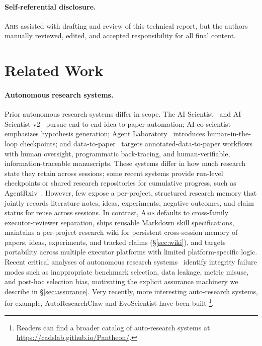 \documentclass{article}
\newcommand{\aris}{\textsc{Aris}}
\theoremstyle{remark}
\begin{document}
\paragraph{Self-referential disclosure.}
\aris{} assisted with drafting and review of this technical report, but the authors manually reviewed, edited, and accepted responsibility for all final content.

 \section{Related Work}
\label{sec:related}


\paragraph{Autonomous research systems.}
Prior autonomous research systems differ in scope.
The AI Scientist~\citep{lu2024aiscientist} and AI Scientist-v2~\citep{yamada2025aiscientistv2} pursue end-to-end idea-to-paper automation; AI co-scientist~\citep{gottweis2025coscientist} emphasizes hypothesis generation; Agent Laboratory~\citep{schmidgall2025agentrxiv} introduces human-in-the-loop checkpoints; and data-to-paper~\citep{ifargan2024data2paper} targets annotated-data-to-paper workflows with human oversight, programmatic back-tracing, and human-verifiable, information-traceable manuscripts.
These systems differ in how much research state they retain across sessions; some recent systems provide run-level checkpoints or shared research repositories for cumulative progress, such as AgentRxiv~\citep{schmidgall2025agentrxiv}. However, few expose a per-project, structured research memory that jointly records literature notes, ideas, experiments, negative outcomes, and claim status for reuse across sessions.
In contrast, \aris{} defaults to cross-family executor-reviewer separation, ships reusable Markdown skill specifications, maintains a per-project research wiki for persistent cross-session memory of papers, ideas, experiments, and tracked claims (\S\ref{sec:wiki}), and targets portability across multiple executor platforms with limited platform-specific logic.
Recent critical analyses of autonomous research systems~\citep{luo2025aiscientistpitfalls} identify integrity failure modes such as inappropriate benchmark selection, data leakage, metric misuse, and post-hoc selection bias, motivating the explicit assurance machinery we describe in \S\ref{sec:assurance}. Very recently, more interesting auto-research systems, for example, AutoResearchClaw \citep{liu2026autoresearchclaw} and EvoScientist \citep{evoscientist2026} have been built \footnote{Readers can find a broader catalog of auto-research systems at \url{https://cadslab.github.io/Pantheon/}.}.
\end{document}
